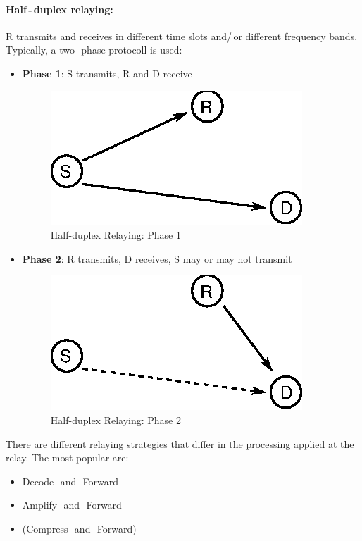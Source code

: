 \documentclass[a4paper, 10pt]{article}
\begin{document}
\paragraph{Half\,-\,duplex relaying:} 
R transmits and receives in different time slots and/\,or different frequency bands. Typically, a two\,-\,phase protocoll is used:
\begin{itemize}
	\item[] \textbf{Phase 1}: S transmits, R and D receive 
	\begin{figure}[ht]
		\centering
		\includegraphics[scale=1.3]{Relay_HalfDuplex_1}	
		\caption{Half-duplex Relaying: Phase 1}
		\label{fig:relay_halfduplex_1}
	\end{figure}
	\item[] \textbf{Phase 2}: R transmits, D receives, S may or may not transmit 
	\begin{figure}[ht]
		\centering
		\includegraphics[scale=1.3]{Relay_HalfDuplex_2}	
		\caption{Half-duplex Relaying: Phase 2}
		\label{fig:relay_halfduplex_2}
	\end{figure}
\end{itemize}
There are different relaying strategies that differ in the processing applied at the relay. The most popular are:
\begin{itemize}
	\item Decode\,-\,and\,-\,Forward
	\item Amplify\,-\,and\,-\,Forward
	\item (Compress\,-\,and\,-\,Forward)
\end{itemize}
\end{document}
